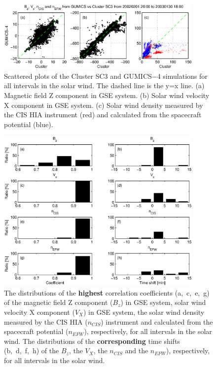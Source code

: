 \documentclass[linenumbers,draft]{agujournal}
\begin{document}
\pagebreak

\begin{figure}[h]
\centering
\includegraphics[width=0.9\textwidth,angle=0]{swe-2020-corr-f04}
\caption{Scattered plots of the Cluster SC3 and GUMICS$-$4 simulations for all intervals in the solar wind. The dashed line is the y=x line. (a) Magnetic field Z component in GSE system. (b) Solar wind velocity X component in GSE system. (c) Solar wind density measured by the CIS HIA instrument (red) and calculated from the spacecraft potential (blue).}
\label{fig:swscatplot}
\end{figure}

\pagebreak

\begin{figure}[h]
\centering
\includegraphics[width=0.9\textwidth,angle=0]{swe-2020-corr-f05}  
\caption{The distributions of the \textbf{highest} correlation coefficients (a,~c,~e,~g) of the magnetic field Z component ($B_z$) in GSE system, solar wind velocity X component ($V_X$) in GSE system, the solar wind density measured by the CIS HIA ($n_{CIS}$) instrument and calculated from the spacecraft potential ($n_{EFW}$), respectively, for all intervals in the solar wind. The distributions of the \textbf{corresponding} time shifts (b,~d,~f,~h) of the $B_z$, the $V_X$, the $n_{CIS}$ and the $n_{EFW}$), respectively, for all intervals in the solar wind.}
\label{fig:swcorrplot}
\end{figure}
\end{document}
